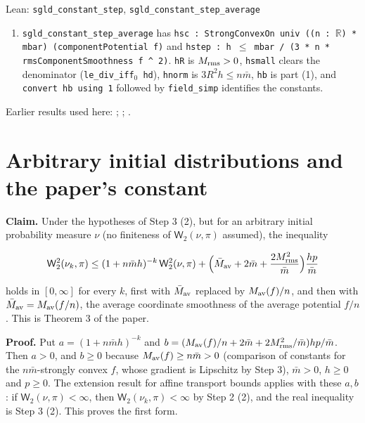 \documentclass[11pt,a4paper]{article}
\begin{document}
\begin{leanbox}{Lean: \texttt{sgld\_\allowbreak{}constant\_\allowbreak{}step}, \texttt{sgld\_\allowbreak{}constant\_\allowbreak{}step\_\allowbreak{}average}}
\begin{enumerate}
\item \texttt{sgld\_\allowbreak{}constant\_\allowbreak{}step\_\allowbreak{}average} has \texttt{hsc : Strong\allowbreak{}Convex\allowbreak{}On univ ((n : \ensuremath{\mathbb R}) * mbar) (component\allowbreak{}Potential f)} and \texttt{hstep : h \ensuremath{\le} mbar /\allowbreak{} (3 * n * rms\allowbreak{}Component\allowbreak{}Smoothness f \textasciicircum{} 2)}. \texttt{h\allowbreak{}R} is \(M_{\rm rms}>0\), \texttt{hsmall} clears the denominator (\texttt{le\_\allowbreak{}div\_\allowbreak{}iff\ensuremath{{}_{0}} hd}), \texttt{hnorm} is \(3R^2h\le n\bar m\), \texttt{hb} is part (1), and \texttt{convert hb using 1} followed by \texttt{field\_\allowbreak{}simp} identifies the constants.

\end{enumerate}
\end{leanbox}


Earlier results used here: \cite[Section~3.17.3]{LangevinLean2026ULASC}; \cite[Section~3.17.4]{LangevinLean2026ULASC}; \cite[Section~3.26.3]{LangevinLean2026ULASC}.

\section{\texorpdfstring{Arbitrary initial distributions and the paper's constant}{Arbitrary initial distributions and the paper's constant}}


\textbf{Claim.} Under the hypotheses of Step 3 (2), but for an arbitrary initial probability measure \(\nu\) (no finiteness of \(\mathsf W_2(\nu,\pi)\) assumed), the inequality


\[\mathsf W_2^2(\nu_k,\pi)\le(1+n\bar mh)^{-k}\,\mathsf W_2^2(\nu,\pi)+\Bigl(\bar M_{\rm av}+2\bar m+\frac{2M_{\rm rms}^2}{\bar m}\Bigr)\frac{hp}{\bar m}\]


holds in \([0,\infty]\) for every \(k\), first with \(\bar M_{\rm av}\) replaced by \(M_{\rm av}(f)/n\), and then with \(\bar M_{\rm av}=M_{\rm av}(f/n)\), the average coordinate smoothness of the average potential \(f/n\). This is Theorem 3 of the paper.




\textbf{Proof.} Put \(a=(1+n\bar mh)^{-k}\) and \(b=(M_{\rm av}(f)/n+2\bar m+2M_{\rm rms}^2/\bar m)hp/\bar m\). Then \(a>0\), and \(b\ge0\) because \(M_{\rm av}(f)\ge n\bar m>0\) (comparison of constants for the \(n\bar m\)-strongly convex \(f\), whose gradient is Lipschitz by Step 3), \(\bar m>0\), \(h\ge0\) and \(p\ge0\). The extension result for affine transport bounds applies with these \(a,b\): if \(\mathsf W_2(\nu,\pi)<\infty\), then \(\mathsf W_2(\nu_k,\pi)<\infty\) by Step 2 (2), and the real inequality is Step 3 (2). This proves the first form.
\end{document}
